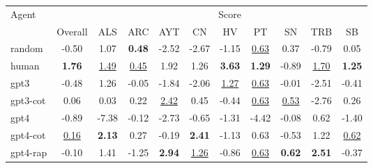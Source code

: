 \begin{tabular}{lcccccccccc}
\toprule
Agent &  & \multicolumn{9}{c}{Score} \\
\cmidrule(lr){2-11}
 &  Overall & ALS & ARC & AYT & CN & HV & PT & SN & TRB & SB \\
\midrule
random & -0.50 & 1.07 & \textbf{0.48} & -2.52 & -2.67 & -1.15 & \underline{0.63} & 0.37 & -0.79 & 0.05 \\
human & \textbf{1.76} & \underline{1.49} & \underline{0.45} & 1.92 & 1.26 & \textbf{3.63} & \textbf{1.29} & -0.89 & \underline{1.70} & \textbf{1.25} \\
gpt3 & -0.48 & 1.26 & -0.05 & -1.84 & -2.06 & \underline{1.27} & \underline{0.63} & -0.01 & -2.51 & -0.41 \\
gpt3-cot & 0.06 & 0.03 & 0.22 & \underline{2.42} & 0.45 & -0.44 & \underline{0.63} & \underline{0.53} & -2.76 & 0.26 \\
gpt4 & -0.89 & -7.38 & -0.12 & -2.73 & -0.65 & -1.31 & -4.42 & -0.08 & 0.62 & -1.40 \\
gpt4-cot & \underline{0.16} & \textbf{2.13} & 0.27 & -0.19 & \textbf{2.41} & -1.13 & 0.63 & -0.53 & 1.22 & \underline{0.62} \\
gpt4-rap & -0.10 & 1.41 & -1.25 & \textbf{2.94} & \underline{1.26} & -0.86 & \underline{0.63} & \textbf{0.62} & \textbf{2.51} & -0.37 \\
\bottomrule
\end{tabular}
